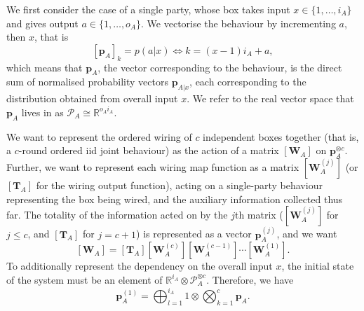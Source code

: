 \documentclass[10pt, a4paper]{article}
\numberwithin{equation}{section} %
\theoremstyle{definition}
\theoremstyle{plain}
\newcommand{\dintv}[2]{\mathopen\{#1,\ldots,#2\mathclose\}}
\newcommand{\?}{\mathrel{?}} %
\newcommand{\R}{\mathbb{R}} %
\newcommand{\cvec}[1]{\boldsymbol{\mathbf{#1}}}    %
\newcommand{\matr}[2][]{\left[\mathbf{#2}#1\right]} %
\newcommand{\sP}{\mathcal{P}}
\begin{document}
              We first consider the case of a single party, whose box takes input \(x \in \dintv{1}{i_A}\) and gives output \(a \in \dintv{1}{o_A}\). We vectorise the behaviour by incrementing \(a\), then \(x\), that is
              \begin{equation}
                \matr[_A]{p}_k = p(a|x) \Leftrightarrow k = (x-1) i_A + a,
              \end{equation}
              which means that \(\cvec{p}_A\), the vector corresponding to the behaviour, is the direct sum of normalised probability vectors \(\cvec{p}_{A|x}\), each corresponding to the distribution obtained from overall input \(x\). We refer to the real vector space that \(\cvec{p}_A\) lives in as \(\sP_A \cong \R^{o_Ai_A}\).

              We want to represent the ordered wiring of \(c\) independent boxes together (that is, a \(c\)-round ordered iid joint behaviour) as the action of a matrix \(\matr[_A]{W}\) on \(\cvec{p}_A^{\otimes c}\). Further, we want to represent each wiring map function as a matrix \(\matr[_A^{(j)}]{W}\) (or \(\matr[_A]{T}\) for the wiring output function), acting on a single-party behaviour representing the box being wired, and the auxiliary information collected thus far. The totality of the information acted on by the \(j\)th matrix (\(\matr[_A^{(j)}]{W}\) for \(j \leq c\), and \(\matr[_A]{T}\) for \(j = c+1\)) is represented as a vector \(\cvec{p}^{(j)}_A\), and we want
              \begin{equation} \matr[_A]{W} = \matr[_A]{T} \matr[_A^{(c)}]{W} \matr[_A^{(c-1)}]{W} \cdots \matr[_A^{(1)}]{W}. \end{equation}
              To additionally represent the dependency on the overall input \(x\), the initial state of the system must be an element of \(\R^{i_A} \otimes \sP_A^{\otimes c}\). Therefore, we have
              \begin{equation}
                \cvec{p}_A^{(1)} = \bigoplus_{l=1}^{i_A} 1 \otimes \bigotimes_{k=1}^c \cvec{p}_A.
              \end{equation}
\end{document}
